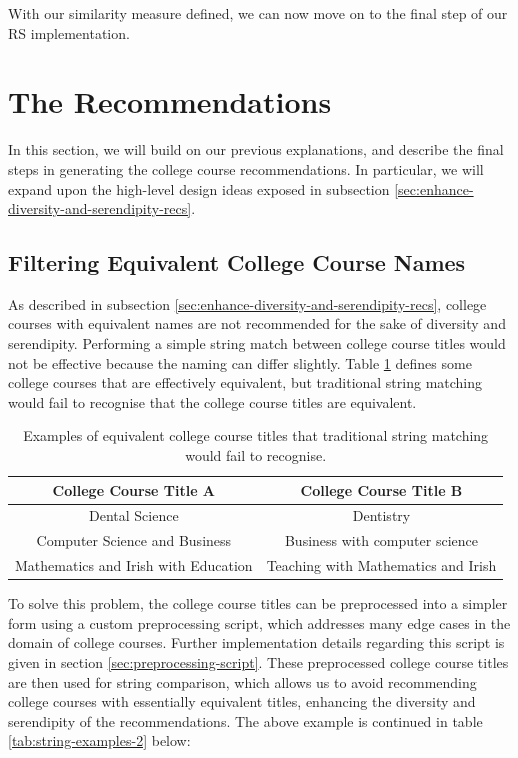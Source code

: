 With our similarity measure defined, we can now move on to the final step of our RS implementation.

\section{The Recommendations}

In this section, we will build on our previous explanations, and describe the final steps in generating the college course recommendations.
In particular, we will expand upon the high-level design ideas exposed in subsection \ref{sec:enhance-diversity-and-serendipity-recs}.

\subsection{Filtering Equivalent College Course Names}
\label{sec:identical-college-course-names-impl}

As described in subsection \ref{sec:enhance-diversity-and-serendipity-recs}, 
college courses with equivalent names are not recommended for the sake of diversity and serendipity. 
Performing a simple string match between college course titles would not be effective because the naming can differ slightly.
Table \ref{tab:string-examples-1} defines some college courses that are effectively equivalent, 
but traditional string matching would fail to recognise that the college course titles are equivalent.

\begin{table}[H]
\centering
\begin{tabular}{|c|c|}
\hline
\textbf{College Course Title A} & \textbf{College Course Title B} \\
\hline
Dental Science & Dentistry\\
\hline
Computer Science and Business & Business with computer science\\
\hline
Mathematics and Irish with Education & Teaching with Mathematics and Irish\\
\hline
\end{tabular}
\caption{Examples of equivalent college course titles that traditional string matching would fail to recognise.}
\label{tab:string-examples-1}
\end{table}

To solve this problem, the college course titles can be preprocessed into a simpler form
using a custom preprocessing script, which addresses many edge cases in the domain of college courses.
Further implementation details regarding this script is given in section \ref{sec:preprocessing-script}.
These preprocessed college course titles are then used for string comparison,
which allows us to avoid recommending college courses with essentially equivalent titles,
enhancing the diversity and serendipity of the recommendations.
The above example is continued in table \ref{tab:string-examples-2} below:

